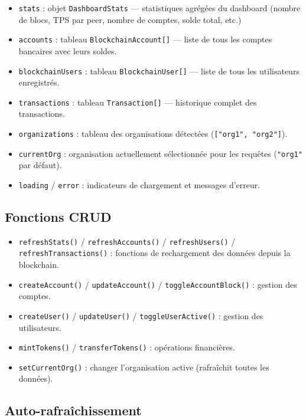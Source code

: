 \documentclass[12pt,a4paper,twoside]{report}
\begin{document}
\begin{itemize}
    \item \texttt{stats} : objet \texttt{DashboardStats} --- statistiques agrégées du dashboard (nombre de blocs, TPS par peer, nombre de comptes, solde total, etc.)
    \item \texttt{accounts} : tableau \texttt{BlockchainAccount[]} --- liste de tous les comptes bancaires avec leurs soldes.
    \item \texttt{blockchainUsers} : tableau \texttt{BlockchainUser[]} --- liste de tous les utilisateurs enregistrés.
    \item \texttt{transactions} : tableau \texttt{Transaction[]} --- historique complet des transactions.
    \item \texttt{organizations} : tableau des organisations détectées (\texttt{["org1", "org2"]}).
    \item \texttt{currentOrg} : organisation actuellement sélectionnée pour les requêtes (\texttt{"org1"} par défaut).
    \item \texttt{loading} / \texttt{error} : indicateurs de chargement et messages d'erreur.
\end{itemize}

\subsection{Fonctions CRUD}

\begin{itemize}
    \item \texttt{refreshStats()} / \texttt{refreshAccounts()} / \texttt{refreshUsers()} / \texttt{refreshTransactions()} : fonctions de rechargement des données depuis la blockchain.
    \item \texttt{createAccount()} / \texttt{updateAccount()} / \texttt{toggleAccountBlock()} : gestion des comptes.
    \item \texttt{createUser()} / \texttt{updateUser()} / \texttt{toggleUserActive()} : gestion des utilisateurs.
    \item \texttt{mintTokens()} / \texttt{transferTokens()} : opérations financières.
    \item \texttt{setCurrentOrg()} : changer l'organisation active (rafraîchit toutes les données).
\end{itemize}

\subsection{Auto-rafraîchissement}
\end{document}

